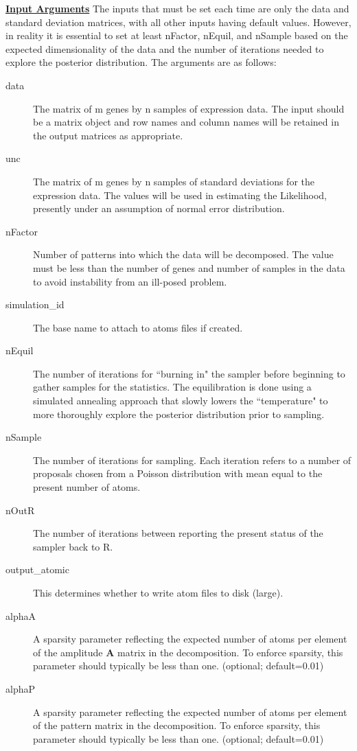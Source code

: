 \documentclass{report}
\begin{document}
\par \noindent \textbf{\underline{Input Arguments}}
The inputs that must be set each time are only the data and standard deviation matrices, with all other inputs having default values.  However, in reality it is essential to set at least nFactor, nEquil, and nSample based on the expected dimensionality of the data and the number of iterations needed to explore the posterior distribution.  The arguments are as follows:
\begin{description}
\item[data]{The matrix of m genes by n samples of expression data.  The input should be a matrix object and row names and column names will be retained in the output matrices as appropriate.  }
\item[unc]{The matrix of m genes by n samples of standard deviations for the expression data.  The values will be used in estimating the Likelihood, presently under an assumption of normal error distribution.}
\item[nFactor]{Number of patterns into which the data will be decomposed.  The value must be less than the number of genes and number of samples in the data to avoid instability from an ill-posed problem.}
\item[simulation_id]{The base name to attach to atoms files if created.}
\item[nEquil]{The number of iterations for ``burning in" the sampler before beginning to gather samples for the statistics. The equilibration is done using a simulated annealing approach that slowly lowers the ``temperature" to more thoroughly explore the posterior distribution prior to sampling.}
\item[nSample]{The number of iterations for sampling.  Each iteration refers to a number of proposals chosen from a Poisson distribution with mean equal to the present number of atoms.}
\item[nOutR]{The number of iterations between reporting the present status of the sampler back to R.}
\item[output_atomic]{This determines whether to write atom files to disk (large).}
\item[alphaA]{A sparsity parameter reflecting the expected number of atoms per element of the amplitude $\mathbf{A}$ matrix in the decomposition.  To enforce sparsity, this parameter should typically be less than one. (optional; default=0.01)}
\item[alphaP]{A sparsity parameter reflecting the expected number of atoms per element of the pattern matrix in the decomposition.  To enforce sparsity, this parameter should typically be less than one. (optional; default=0.01)}

\end{description}
\end{document}
